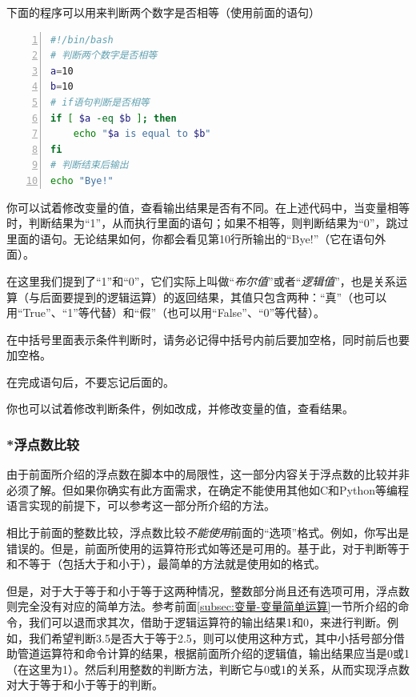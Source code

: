 下面的程序可以用来判断两个数字是否相等（使用前面的语句）

\begin{lstlisting}[language=bash,caption=if\_equal,numbers=left]
#!/bin/bash
# 判断两个数字是否相等
a=10
b=10
# if语句判断是否相等
if [ $a -eq $b ]; then
    echo "$a is equal to $b"
fi
# 判断结束后输出
echo "Bye!"
\end{lstlisting}

你可以试着修改变量的值，查看输出结果是否有不同。在上述代码中，当变量相等时，判断结果为“1”，从而执行里面的语句；如果不相等，则判断结果为“0”，跳过里面的语句。无论结果如何，你都会看见第10行所输出的“Bye!”（它在语句外面）。

\begin{extend}
    在这里我们提到了“1”和“0”，它们实际上叫做“\emph{布尔值}”或者“\emph{逻辑值}”，也是关系运算（与后面要提到的逻辑运算）的返回结果，其值只包含两种：“真”（也可以用“True”、“1”等代替）和“假”（也可以用“False”、“0”等代替）。
\end{extend}

\begin{attention}
    在中括号里面表示条件判断时，请务必记得中括号内前后要加空格，同时前后也要加空格。

    在完成语句后，不要忘记后面的。
\end{attention}

你也可以试着修改判断条件，例如改成，并修改变量的值，查看结果。

\subsubsection{*浮点数比较}

\begin{extend}
    由于前面所介绍的浮点数在脚本中的局限性，这一部分内容关于浮点数的比较并非必须了解。但如果你确实有此方面需求，在确定不能使用其他如C和Python等编程语言实现的前提下，可以参考这一部分所介绍的方法。

    相比于前面的整数比较，浮点数比较\emph{不能使用}前面的“选项”格式。例如，你写出是错误的。但是，前面所使用的运算符形式如\code{==, !=}等还是可用的。基于此，对于判断等于和不等于（包括大于和小于），最简单的方法就是使用如的格式。

    但是，对于大于等于和小于等于这两种情况，整数部分尚且还有选项可用，浮点数则完全没有对应的简单方法。参考前面\ref{subsec:变量-变量简单运算}一节所介绍的命令，我们可以退而求其次，借助于逻辑运算符的输出结果1和0，来进行判断。例如，我们希望判断3.5是否大于等于2.5，则可以使用这种方式，其中小括号部分借助管道运算符和命令计算的结果，根据前面所介绍的逻辑值，输出结果应当是0或1（在这里为1）。然后利用整数的判断方法，判断它与0或1的关系，从而实现浮点数对大于等于和小于等于的判断。
\end{extend}

